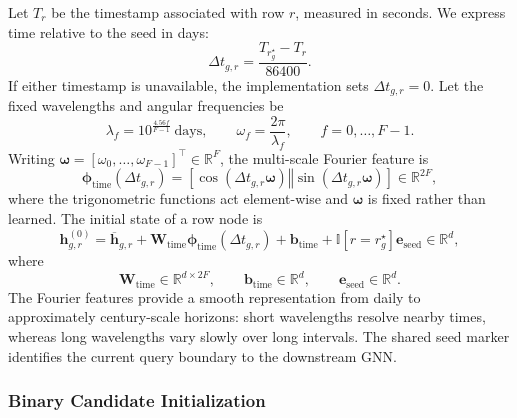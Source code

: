 \documentclass[11pt]{article}
\newcommand{\R}{\mathbb{R}}
\newcommand{\concat}{\mathbin{\Vert}}
\newcommand{\ind}{\mathbb{I}}
\begin{document}
Let \(T_r\) be the timestamp associated with row \(r\), measured in seconds.
We express time relative to the seed in days:
\begin{equation}
    \Delta t_{g,r}
    =
    \frac{T_{r_g^\star}-T_r}{86400}.
    \label{eq:relative-time}
\end{equation}
If either timestamp is unavailable, the implementation sets
\(\Delta t_{g,r}=0\).  Let the fixed wavelengths and angular frequencies be
\begin{equation}
    \lambda_f
    =
    10^{\frac{4.56f}{F-1}}
    \ \text{days},
    \qquad
    \omega_f
    =
    \frac{2\pi}{\lambda_f},
    \qquad
    f=0,\ldots,F-1.
    \label{eq:temporal-frequencies}
\end{equation}
Writing \(\boldsymbol\omega=[\omega_0,\ldots,\omega_{F-1}]^\top\in\R^F\),
the multi-scale Fourier feature is
\begin{equation}
    \boldsymbol\phi_{\mathrm{time}}(\Delta t_{g,r})
    =
    \left[
        \cos(\Delta t_{g,r}\boldsymbol\omega)
        \concat
        \sin(\Delta t_{g,r}\boldsymbol\omega)
    \right]
    \in\R^{2F},
    \label{eq:time-feature}
\end{equation}
where the trigonometric functions act element-wise and
\(\boldsymbol\omega\) is fixed rather than learned.  The initial state of a
row node is
\begin{equation}
    \boxed{
    \mathbf h_{g,r}^{(0)}
    =
    \overline{\mathbf h}_{g,r}
    +
    \mathbf W_{\mathrm{time}}
    \boldsymbol\phi_{\mathrm{time}}(\Delta t_{g,r})
    +
    \mathbf b_{\mathrm{time}}
    +
    \ind[r=r_g^\star]\mathbf e_{\mathrm{seed}}
    }
    \in\R^d,
    \label{eq:row-initialization}
\end{equation}
where
\begin{equation}
    \mathbf W_{\mathrm{time}}\in\R^{d\times2F},
    \qquad
    \mathbf b_{\mathrm{time}}\in\R^d,
    \qquad
    \mathbf e_{\mathrm{seed}}\in\R^d.
    \label{eq:time-seed-domains}
\end{equation}
The Fourier features provide a smooth representation from daily to
approximately century-scale horizons: short wavelengths resolve nearby
times, whereas long wavelengths vary slowly over long intervals.  The
shared seed marker identifies the current query boundary to the downstream
GNN.

\subsubsection{Binary Candidate Initialization}
\label{sec:candidate-init}
\end{document}
